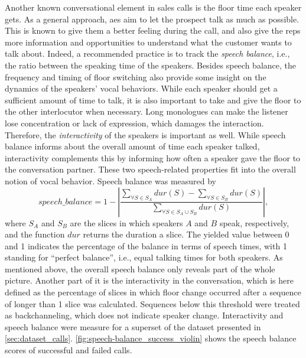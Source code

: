 %
Another known conversational element in sales calls is the floor time each speaker gets.
As a general approach, \acp{ae} aim to let the prospect talk as much as possible.
This is known to give them a better feeling during the call, and also give the reps more information and opportunities to understand what the customer wants to talk about.
Indeed, a recommended practice is to track the \emph{speech balance}, i.e., the ratio between the speaking time of the speakers.
Besides speech balance, the frequency and timing of floor switching also provide some insight on the dynamics of the speakers' vocal behaviors.
While each speaker should get a sufficient amount of time to talk, it is also important to take and give the floor to the other interlocutor when necessary.
Long monologues can make the listener lose concentration or lack of expression, which damages the interaction.
Therefore, the \emph{interactivity} of the speakers is important as well.
While speech balance informs about the overall amount of time each speaker talked, interactivity complements this by informing how often a speaker gave the floor to the conversation partner.
These two speech-related properties fit into the overall notion of vocal behavior.
Speech balance was measured by
%
\begin{equation}
	\label{eq:speech_balance}
	speech\_balance = 
	1 - \left| \frac{\displaystyle \sum_{\forall S \in S_A} dur(S) - 
						\sum_{\forall S \in S_B} dur(S)}
					{\displaystyle \sum_{\forall S \in S_A \cup S_B} dur(S)}
		\right|,
\end{equation}
\noindent
%
where $S_A$ and $S_B$ are the slices in which speakers $A$ and $B$ speak, respectively, and the function $dur$ returns the duration a slice.
The yielded value between 0 and 1 indicates the percentage of the balance in terms of speech times, with 1 standing for \enquote{perfect balance}, i.e., equal talking times for both speakers.
As mentioned above, the overall speech balance only reveals part of the whole picture.
Another part of it is the interactivity in the conversation, which is here defined as the percentage of slices in which floor change occurred after a sequence of longer than 1 slice was calculated.
Sequences below this threshold were treated as backchanneling, which does not indicate speaker change.
Interactivity and speech balance were measure for a superset of the dataset presented in \cref{sec:dataset_calls}. %
\cref{fig:speech-balance_success_violin} shows the speech balance scores of successful and failed calls.
